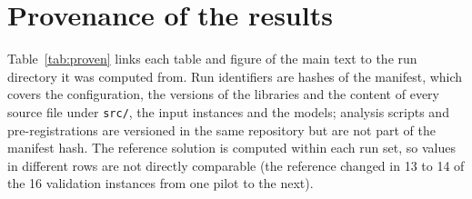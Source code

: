 \section{Provenance of the results}\label{app:provenance}
Table~\ref{tab:proven} links each table and figure of the main text to the run directory it was
computed from. Run identifiers are hashes of the manifest, which covers the configuration, the
versions of the libraries and the content of every source file under \texttt{src/}, the input
instances and the models; analysis scripts and pre-registrations are versioned in the same
repository but are not part of the manifest hash. The reference solution is computed within each
run set, so values in different rows are not directly comparable (the reference changed in 13 to
14 of the 16 validation instances from one pilot to the next).

